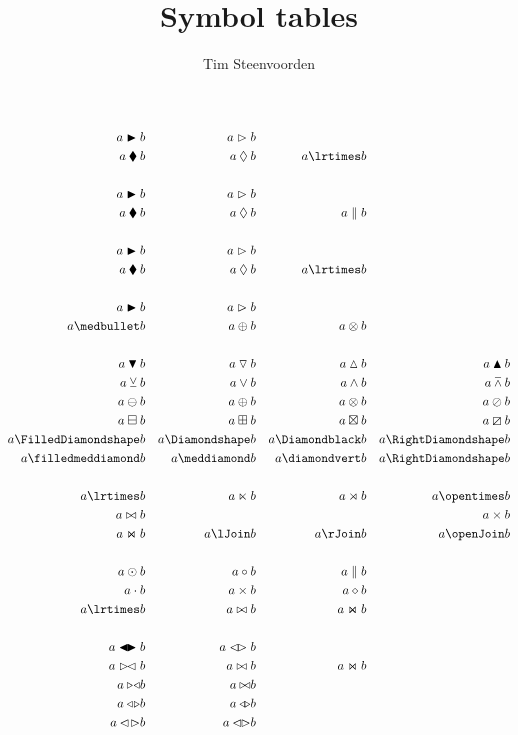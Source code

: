 \documentclass
  [a4paper
  ,justified
  ,nofonts
  ]{tufte-handout}
\begin{document}
\title{Symbol tables}
\author{Tim Steenvoorden}


\def\L{\blacktriangleleft}
\def\R{\blacktriangleright}
\def\l{\vartriangleleft}
\def\r{\vartriangleright}

\def\ior{\mathbin{\blacklozenge}}
\def\eor{\mathbin{\lozenge}}


\begin{align}
  a \R b && a \r b \\
  a \ior b && a \eor b && a \lrtimes b \\
  \\
  a \R b && a \r b \\
  a \ior b && a \eor b && a \parallel b \\
  \\
  a \R b && a \r b \\
  a \ior b && a \eor b && a \lrtimes b \\
  \\
  a \R b && a \r b \\
  a \medbullet b && a \oplus b && a \otimes b \\
  \\
  a \mathbin{\blacktriangledown} b && a \mathbin{\triangledown} b && a \mathbin{\vartriangle} b && a \mathbin{\blacktriangle} b \\
  a \veebar b && a \vee b && a \wedge b && a \barwedge b \\
  a \ominus b && a \oplus b && a \otimes b && a \oslash b \\
  a \boxminus b && a \boxplus b && a \boxtimes b && a \boxslash b \\
  a \FilledDiamondshape b && a \Diamondshape b && a \Diamondblack b && a \RightDiamondshape b \\
  a \filledmeddiamond b && a \meddiamond b && a \diamondvert b && a \RightDiamondshape b \\
  \\
  a \lrtimes b && a \ltimes b && a \rtimes b && a \opentimes b \\
  a \bowtie b && && && a \times b \\
  a \Join b && a \lJoin b && a \rJoin b && a \openJoin b \\
  \\
  a \odot b && a \circ b && a \parallel b \\
  a \cdot b && a \times b && a \diamond b \\
  a \lrtimes b && a \bowtie b && a \Join b \\
  \\
  a \L\!\R b && a \l\!\r b \\
  a \r\!\l b && a \bowtie b && a \Join b \\
  a \triangleright\!\triangleleft b && a \triangleright\!\!\triangleleft b \\
  a \triangleleft\!\triangleright b && a \triangleleft\!\!\triangleright b \\
  a \lhd\!\rhd b && a \lhd\!\!\rhd b \\
\end{align}
\end{document}
